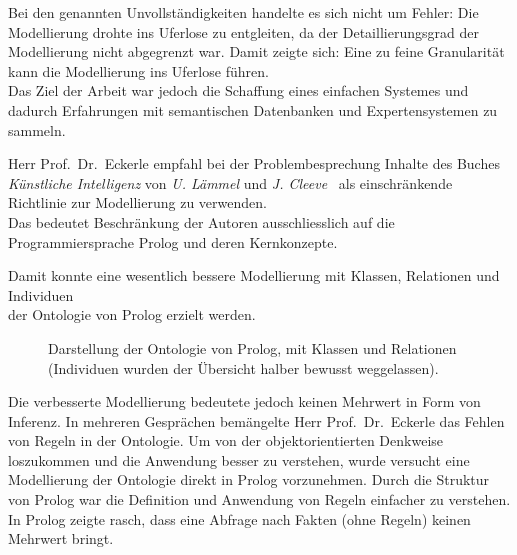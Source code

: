 Bei den genannten Unvollständigkeiten handelte es sich nicht um Fehler: Die Modellierung drohte ins Uferlose zu entgleiten, da der Detaillierungsgrad der Modellierung nicht abgegrenzt war. Damit zeigte sich: Eine zu feine Granularität kann die Modellierung ins Uferlose führen.\\
Das Ziel der Arbeit war jedoch die Schaffung eines einfachen Systemes und dadurch Erfahrungen mit semantischen Datenbanken und Expertensystemen zu sammeln.

Herr Prof.\ Dr.\ Eckerle empfahl bei der Problembesprechung Inhalte des Buches \textit{Künstliche Intelligenz} von \textit{U. Lämmel} und \textit{J. Cleeve}~\cite{laemmel} als einschränkende Richtlinie zur Modellierung zu verwenden.\\
Das bedeutet Beschränkung der Autoren ausschliesslich auf die Programmiersprache Prolog und deren Kernkonzepte.

Damit konnte eine wesentlich bessere Modellierung mit Klassen, Relationen und Individuen\\
der Ontologie von Prolog erzielt werden.

\begin{figure}[H]
\centering {}
\caption{Darstellung der Ontologie von Prolog, mit Klassen und Relationen (Individuen wurden der Übersicht halber bewusst weggelassen).\label{fig:prolog_baum}\protect\footnotemark}
\end{figure}

Die verbesserte Modellierung bedeutete jedoch keinen Mehrwert in Form von Inferenz. In mehreren Gesprächen bemängelte Herr Prof.\ Dr.\ Eckerle das Fehlen von Regeln in der Ontologie. Um von der objektorientierten Denkweise loszukommen und die Anwendung besser zu verstehen, wurde versucht eine Modellierung der Ontologie direkt in Prolog vorzunehmen. Durch die Struktur von Prolog war die Definition und Anwendung von Regeln einfacher zu verstehen. In Prolog zeigte rasch, dass eine Abfrage nach Fakten (ohne Regeln) keinen Mehrwert bringt.

